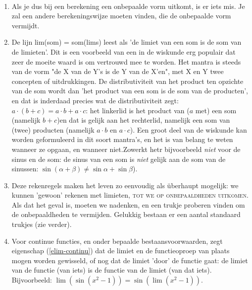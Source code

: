 \documentclass[numbers]{ximera}
\begin{document}
\begin{remark} \ 
	
\begin{enumerate}
	\item Als je dus bij een berekening een onbepaalde vorm uitkomt, is er iets mis. Je zal een andere berekeningswijze moeten vinden, die de onbepaalde vorm vermijdt.
	\item De lijn lim(som) = som(lims) leest als 'de limiet van een som is de som van de limieten'. Dit is een voorbeeld van een in de wiskunde erg populair  dat zeer de moeite waard is om vertrouwd mee te worden. Het mantra is steeds van de vorm "de X van de Y's is de Y van de X'en", met X en Y twee concepten of uitdrukkingen. De distributiviteit van het product ten opzichte van de som wordt dan 'het product van een som is de som van de producten', en dat is inderdaad precies wat de distributiviteit zegt: $a\cdot(b+c) = a\cdot b+a\cdot c$: het linkerlid is het product van ($a$ met) een som (namelijk $b+c$)en dat is gelijk aan het rechterlid, namelijk een som van (twee) producten (namelijk $a\cdot b$ en $a\cdot c$). Een groot deel van de wiskunde kan worden geformuleerd in dit soort mantra's, en het is van belang te weten wanneer ze opgaan, en wanneer niet.Zowerkt hetr bijvoorbeeld \textit{niet} voor de sinus en de som: de sinus van een som is \textit{niet} gelijk aan de som van de sinussen: $\sin(\alpha+\beta) \neq \sin\alpha+\sin\beta$). 
	\item Deze rekenregels maken het leven zo eenvoudig als überhaupt mogelijk: we kunnen 'gewoon' rekenen met limieten, \textsc{tot we op onbepaaldheden uitkomen}. Als dat het geval is, moeten we nadenken, en een trukje proberen vinden om de onbepaaldheden te  vermijden. Gelukkig bestaan er een aantal standaard trukjes (zie verder).
	\item Voor continue functies, en onder bepaalde bestaansvoorwaarden, zegt eigenschap (\ref{elim-continu})  dat de limiet en de functieoproep van plaats mogen worden gewisseld, of nog dat de limiet 'door' de functie gaat: de limiet van de functie (van iets) is de functie van de limiet (van dat iets). Bijvoorbeeld: $\lim(\sin(x^2-1)) = \sin(\lim(x^2-1))$.


\end{enumerate}
\end{remark}
\end{document}
